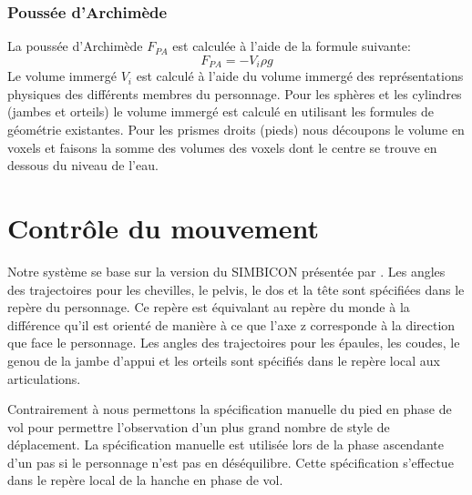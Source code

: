 \documentclass[runningheads,a4paper]{llncs}
\begin{document}
\subsubsection{Poussée d'Archimède}
%
La poussée d'Archimède $F_{PA}$ est calculée à l'aide de la formule suivante:
\[
F_{PA}=-V_i \rho g
\]
Le volume immergé \(V_i\) est calculé à l'aide du volume immergé des représentations physiques des différents membres du personnage.  Pour les sphères et les cylindres (jambes et orteils) le volume immergé est calculé en utilisant les formules de géométrie existantes. Pour les prismes droits (pieds) nous découpons le volume en voxels et faisons la somme des volumes des voxels dont le centre se trouve en dessous du niveau de l'eau.
%
\section{Contrôle du mouvement}
\label{sec:controler}
%
Notre système se base sur la version du SIMBICON présentée par \cite{coros2010generalized}. Les angles des trajectoires pour les chevilles, le pelvis, le dos et la tête sont spécifiées dans le repère du personnage. Ce repère est équivalant au repère du monde à la différence qu'il est orienté de manière à ce que l'axe z corresponde à la direction que face le personnage. Les angles des trajectoires pour les épaules, les coudes, le genou de la jambe d'appui et les orteils sont spécifiés dans le repère local aux articulations.

Contrairement à \cite{coros2010generalized} nous permettons la spécification manuelle du pied en phase de vol pour permettre l'observation d'un plus grand nombre de style de déplacement. La spécification manuelle est utilisée lors de la phase ascendante d'un pas si le personnage n'est pas en déséquilibre. Cette spécification s'effectue dans le repère local de la hanche en phase de vol.

%
\end{document}
